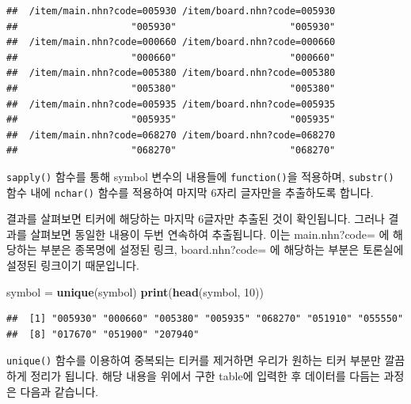 \documentclass[]{book}
\newenvironment{Shaded}{\begin{snugshade}}{\end{snugshade}}
\newcommand{\DecValTok}[1]{\textcolor[rgb]{0.00,0.00,0.81}{#1}}
\newcommand{\KeywordTok}[1]{\textcolor[rgb]{0.13,0.29,0.53}{\textbf{#1}}}
\newcommand{\NormalTok}[1]{#1}
\newcommand{\OperatorTok}[1]{\textcolor[rgb]{0.81,0.36,0.00}{\textbf{#1}}}
\newcommand{\OtherTok}[1]{\textcolor[rgb]{0.56,0.35,0.01}{#1}}
\newcommand{\StringTok}[1]{\textcolor[rgb]{0.31,0.60,0.02}{#1}}
\begin{document}
\begin{verbatim}
##  /item/main.nhn?code=005930 /item/board.nhn?code=005930 
##                    "005930"                    "005930" 
##  /item/main.nhn?code=000660 /item/board.nhn?code=000660 
##                    "000660"                    "000660" 
##  /item/main.nhn?code=005380 /item/board.nhn?code=005380 
##                    "005380"                    "005380" 
##  /item/main.nhn?code=005935 /item/board.nhn?code=005935 
##                    "005935"                    "005935" 
##  /item/main.nhn?code=068270 /item/board.nhn?code=068270 
##                    "068270"                    "068270"
\end{verbatim}

\texttt{sapply()} 함수를 통해 symbol 변수의 내용들에 \texttt{function()}을 적용하며, \texttt{substr()} 함수 내에 \texttt{nchar()} 함수를 적용하여 마지막 6자리 글자만을 추출하도록 합니다.

결과를 살펴보면 티커에 해당하는 마지막 6글자만 추출된 것이 확인됩니다. 그러나 결과를 살펴보면 동일한 내용이 두번 연속하여 추출됩니다. 이는 main.nhn?code= 에 해당하는 부분은 종목명에 설정된 링크, board.nhn?code= 에 해당하는 부분은 토론실에 설정된 링크이기 때문입니다.

\begin{Shaded}
\begin{Highlighting}[]
\NormalTok{symbol =}\StringTok{ }\KeywordTok{unique}\NormalTok{(symbol)}
\KeywordTok{print}\NormalTok{(}\KeywordTok{head}\NormalTok{(symbol, }\DecValTok{10}\NormalTok{))}
\end{Highlighting}
\end{Shaded}

\begin{verbatim}
##  [1] "005930" "000660" "005380" "005935" "068270" "051910" "055550"
##  [8] "017670" "051900" "207940"
\end{verbatim}

\texttt{unique()} 함수를 이용하여 중복되는 티커를 제거하면 우리가 원하는 티커 부분만 깔끔하게 정리가 됩니다. 해당 내용을 위에서 구한 table에 입력한 후 데이터를 다듬는 과정은 다음과 같습니다.

\begin{Shaded}
\end{Shaded}
\end{document}
